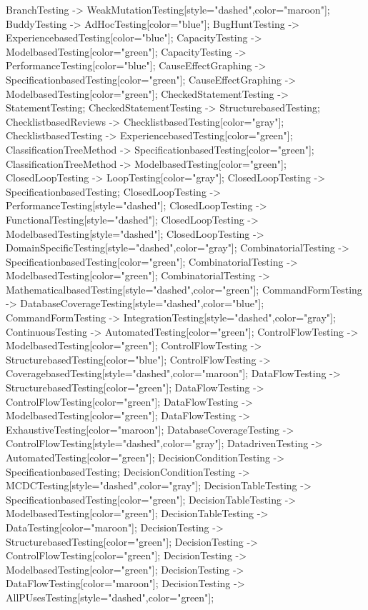 \documentclass{article}
\begin{document}
{BranchTesting -> WeakMutationTesting[style="dashed",color="maroon"];
BuddyTesting -> AdHocTesting[color="blue"];
BugHuntTesting -> ExperiencebasedTesting[color="blue"];
CapacityTesting -> ModelbasedTesting[color="green"];
CapacityTesting -> PerformanceTesting[color="blue"];
CauseEffectGraphing -> SpecificationbasedTesting[color="green"];
CauseEffectGraphing -> ModelbasedTesting[color="green"];
CheckedStatementTesting -> StatementTesting;
CheckedStatementTesting -> StructurebasedTesting;
ChecklistbasedReviews -> ChecklistbasedTesting[color="gray"];
ChecklistbasedTesting -> ExperiencebasedTesting[color="green"];
ClassificationTreeMethod -> SpecificationbasedTesting[color="green"];
ClassificationTreeMethod -> ModelbasedTesting[color="green"];
ClosedLoopTesting -> LoopTesting[color="gray"];
ClosedLoopTesting -> SpecificationbasedTesting;
ClosedLoopTesting -> PerformanceTesting[style="dashed"];
ClosedLoopTesting -> FunctionalTesting[style="dashed"];
ClosedLoopTesting -> ModelbasedTesting[style="dashed"];
ClosedLoopTesting -> DomainSpecificTesting[style="dashed",color="gray"];
CombinatorialTesting -> SpecificationbasedTesting[color="green"];
CombinatorialTesting -> ModelbasedTesting[color="green"];
CombinatorialTesting -> MathematicalbasedTesting[style="dashed",color="green"];
CommandFormTesting -> DatabaseCoverageTesting[style="dashed",color="blue"];
CommandFormTesting -> IntegrationTesting[style="dashed",color="gray"];
ContinuousTesting -> AutomatedTesting[color="green"];
ControlFlowTesting -> ModelbasedTesting[color="green"];
ControlFlowTesting -> StructurebasedTesting[color="blue"];
ControlFlowTesting -> CoveragebasedTesting[style="dashed",color="maroon"];
DataFlowTesting -> StructurebasedTesting[color="green"];
DataFlowTesting -> ControlFlowTesting[color="green"];
DataFlowTesting -> ModelbasedTesting[color="green"];
DataFlowTesting -> ExhaustiveTesting[color="maroon"];
DatabaseCoverageTesting -> ControlFlowTesting[style="dashed",color="gray"];
DatadrivenTesting -> AutomatedTesting[color="green"];
DecisionConditionTesting -> SpecificationbasedTesting;
DecisionConditionTesting -> MCDCTesting[style="dashed",color="gray"];
DecisionTableTesting -> SpecificationbasedTesting[color="green"];
DecisionTableTesting -> ModelbasedTesting[color="green"];
DecisionTableTesting -> DataTesting[color="maroon"];
DecisionTesting -> StructurebasedTesting[color="green"];
DecisionTesting -> ControlFlowTesting[color="green"];
DecisionTesting -> ModelbasedTesting[color="green"];
DecisionTesting -> DataFlowTesting[color="maroon"];
DecisionTesting -> AllPUsesTesting[style="dashed",color="green"];
}
\end{document}
